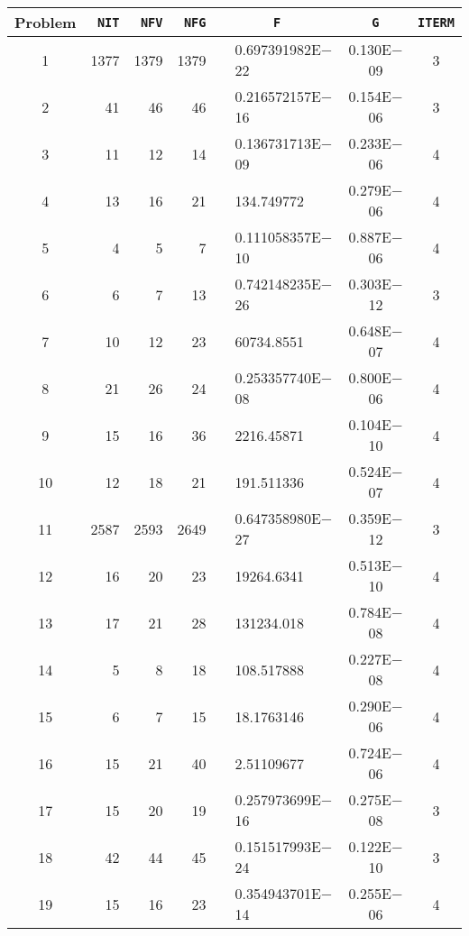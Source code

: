\documentclass{esub2acm}
\begin{document}
\begin{table}
\footnotesize
\centering
\begin{tabular}{c|rrrr@{}lcc} \hline
Problem\rule[-2pt]{0pt}{12pt}  & {\tt NIT} & {\tt NFV} & {\tt NFG} & \multicolumn{2}{c}{\tt F} & {\tt G} & {\tt ITERM} \\ \hline
1\rule[-2pt]{0pt}{12pt} &   1377    &   1379    &   1379    &       &   0.697391982E$-$22   &   0.130E$-$09 &   3   \\
2   &   41  &   46  &   46  &       &   0.216572157E$-$16   &   0.154E$-$06 &   3   \\
3   &   11  &   12  &   14  &       &   0.136731713E$-$09   &   0.233E$-$06 &   4   \\
4   &   13  &   16  &   21  &       &   134.749772  &   0.279E$-$06 &   4   \\
5   &   4   &   5   &   7   &       &   0.111058357E$-$10   &   0.887E$-$06 &   4   \\
6   &   6   &   7   &   13  &       &   0.742148235E$-$26   &   0.303E$-$12 &   3   \\
7   &   10  &   12  &   23  &       &   60734.8551  &   0.648E$-$07 &   4   \\
8   &   21  &   26  &   24  &       &   0.253357740E$-$08   &   0.800E$-$06 &   4   \\
9   &   15  &   16  &   36  &       &   2216.45871  &   0.104E$-$10 &   4   \\
10  &   12  &   18  &   21  &       &   191.511336  &   0.524E$-$07 &   4   \\
11  &   2587    &   2593    &   2649    &       &   0.647358980E$-$27   &   0.359E$-$12 &   3   \\
12  &   16  &   20  &   23  &       &   19264.6341  &   0.513E$-$10 &   4   \\
13  &   17  &   21  &   28  &       &   131234.018  &   0.784E$-$08 &   4   \\
14  &   5   &   8   &   18  &       &   108.517888  &   0.227E$-$08 &   4   \\
15  &   6   &   7   &   15  &       &   18.1763146  &   0.290E$-$06 &   4   \\
16  &   15  &   21  &   40  &       &   2.51109677  &   0.724E$-$06 &   4   \\
17  &   15  &   20  &   19  &       &   0.257973699E$-$16   &   0.275E$-$08 &   3   \\
18  &   42  &   44  &   45  &       &   0.151517993E$-$24   &   0.122E$-$10 &   3   \\
19  &   15  &   16  &   23  &       &   0.354943701E$-$14   &   0.255E$-$06 &   4   \\

\end{tabular}
\end{table}
\end{document}
